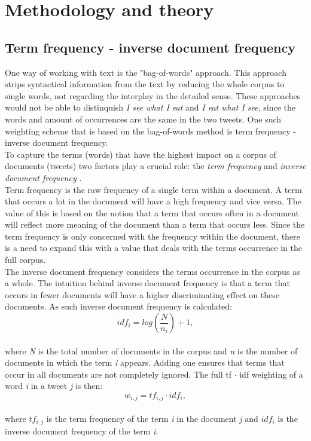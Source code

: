 \section{Methodology and theory}

\subsection{Term frequency - inverse document frequency}
One way of working with text is the "bag-of-words" approach. This approach strips syntactical information from the text by reducing the whole corpus to single words, not regarding the interplay in the detailed sense. These approaches would not be able to distinquish \textit{I see what I eat} and \textit{I eat what I see}, since the words and amount of occurrences are the same in the two tweets. One such weighting scheme that is based on the bag-of-words method is term frequency - inverse document frequency.\\
To capture the terms (words) that have the highest impact on a corpus of documents (tweets) two factors play a crucial role: the \textit{term frequency} and \textit{inverse document frequency} \cite{speech}.\\
Term frequency is the raw frequency of a single term within a document. A term that occurs a lot in the document will have a high frequency and vice versa. The value of this is based on the notion that a term that occurs often in a document will reflect more meaning of the document than a term that occurs less. Since the term frequency is only concerned with the frequency within the document, there is a need to expand this with a value that deals with the terms occurrence in the full corpus.\\
The inverse document frequency considers the terms occurrence in the corpus as a whole. The intuition behind inverse document frequency is that a term that occurs in fewer documents will have a higher discriminating effect on these documents. As such inverse document frequency is calculated:\\
\begin{equation} 
id f_{i} = log \left(\dfrac{N}{n_{i}}\right)+1,
\end{equation}\\
where \textit{N} is the total number of documents in the corpus and \textit{n} is the number of documents in which the term \textit{i} appears. Adding one ensures that terms that occur in all documents are not completely ignored. The full tf $\cdot$ idf weighting of a word \textit{i} in a tweet \textit{j} is then:\\
\begin{equation} 
w_{i,j}= tf_{i,j}\cdot id f_{i},
\end{equation}\\
where $tf_{i,j}$ is the term frequency of the term \textit{i} in the document \textit{j} and $id f_{i}$ is the inverse document frequency of the term \textit{i}.


